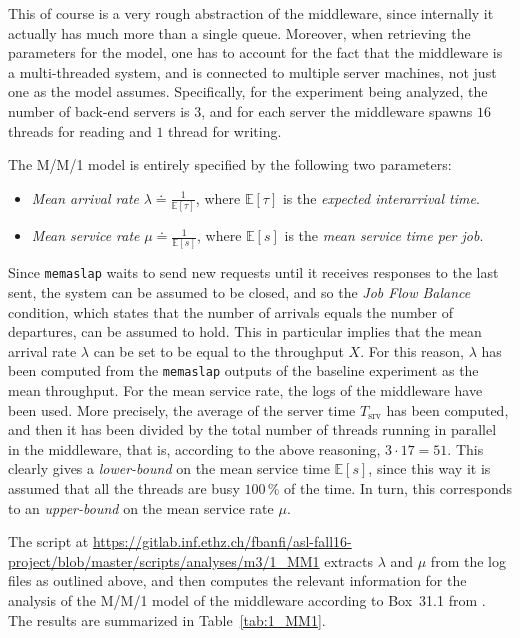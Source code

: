 \documentclass[11pt]{article}
\theoremstyle{definition}
\newcommand\Tsrv{T_{\mathrm{srv}}}
\newcommand\df\doteq
\newcommand\E[1]{\mathbb E[#1]}
\renewcommand\t\texttt
\begin{document}
This of course is a very rough abstraction of the middleware, since internally it actually has much more than a single queue.
Moreover, when retrieving the parameters for the model, one has to account for the fact that the middleware is a multi-threaded system, and is connected to multiple server machines, not just one as the model assumes.
Specifically, for the experiment being analyzed, the number of back-end servers is $3$, and for each server the middleware spawns $16$ threads for reading and $1$ thread for writing.

The M/M/1 model is entirely specified by the following two parameters:
\begin{itemize}
    \item \emph{Mean arrival rate} $\lambda\df\frac1{\E\tau}$, where $\E\tau$ is the \emph{expected interarrival time}.
    \item \emph{Mean service rate} $\mu\df\frac1{\E s}$, where $\E s$ is the \emph{mean service time per job}.
\end{itemize}
Since \t{memaslap} waits to send new requests until it receives responses to the last sent, the system can be assumed to be closed, and so the \emph{Job Flow Balance} condition, which states that the number of arrivals equals the number of departures, can be assumed to hold.
This in particular implies that the mean arrival rate $\lambda$ can be set to be equal to the throughput $X$.
For this reason, $\lambda$ has been computed from the \t{memaslap} outputs of the baseline experiment as the mean throughput.
For the mean service rate, the logs of the middleware have been used.
More precisely, the average of the server time $\Tsrv$ has been computed, and then it has been divided by the total number of threads running in parallel in the middleware, that is, according to the above reasoning, $3\cdot17=51$.
This clearly gives a \emph{lower-bound} on the mean service time $\E s$, since this way it is assumed that all the threads are busy $100\,\%$ of the time.
In turn, this corresponds to an \emph{upper-bound} on the mean service rate $\mu$.

The script at \url{https://gitlab.inf.ethz.ch/fbanfi/asl-fall16-project/blob/master/scripts/analyses/m3/1_MM1} extracts $\lambda$ and $\mu$ from the log files as outlined above, and then computes the relevant information for the analysis of the M/M/1 model of the middleware according to Box~31.1 from \cite{jain91}.
The results are summarized in Table~\ref{tab:1_MM1}.
\end{document}
